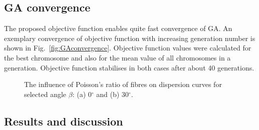 \subsection{GA convergence}

The proposed objective function enables quite fast convergence of GA. An exemplary convergence of objective function with increasing generation number is shown in Fig.~\ref{fig:GAconvergence}. Objective function values were calculated for the best chromosome and also for the mean value of all chromosomes in a generation. Objective function stabilises in both cases after about 40 generations.
	
\begin{figure} [h!]
	\centering
	\begin{subfigure}[b]{0.49\textwidth}
		\centering
		
	
		\caption{}
		\label{fig:nif0}
	\end{subfigure}
	\hfill
	\begin{subfigure}[b]{0.49\textwidth}
		\centering
		
		

		\caption{}
		\label{fig:nif30}
	\end{subfigure}





















	
\caption{The influence of Poisson's ratio of fibres on dispersion curves for selected 
	angle \(\beta\): (a) 0\(^{\circ}\) and (b) 30\(^{\circ}\).}
 
	\label{fig:nif}
\end{figure}

	
\subsection{Results and discussion}

